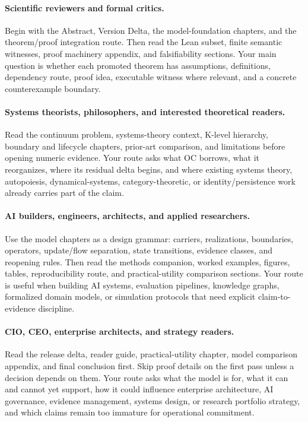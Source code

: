 \paragraph{Scientific reviewers and formal critics.}
Begin with the Abstract, Version Delta, the model-foundation chapters, and the
theorem/proof integration route. Then read the Lean subset, finite semantic
witnesses, proof machinery appendix, and falsifiability sections. Your main
question is whether each promoted theorem has assumptions, definitions,
dependency route, proof idea, executable witness where relevant, and a concrete
counterexample boundary.

\paragraph{Systems theorists, philosophers, and interested theoretical readers.}
Read the continuum problem, systems-theory context, K-level hierarchy, boundary
and lifecycle chapters, prior-art comparison, and limitations before opening
numeric evidence. Your route asks what OC borrows, what it reorganizes, where
its residual delta begins, and where existing systems theory, autopoiesis,
dynamical-systems, category-theoretic, or identity/persistence work already
carries part of the claim.

\paragraph{AI builders, engineers, architects, and applied researchers.}
Use the model chapters as a design grammar: carriers, realizations, boundaries,
operators, update/flow separation, state transitions, evidence classes, and
reopening rules. Then read the methods companion, worked examples, figures,
tables, reproducibility route, and practical-utility comparison sections. Your
route is useful when building AI systems, evaluation pipelines, knowledge
graphs, formalized domain models, or simulation protocols that need explicit
claim-to-evidence discipline.

\paragraph{CIO, CEO, enterprise architects, and strategy readers.}
Read the release delta, reader guide, practical-utility chapter, model
comparison appendix, and final conclusion first. Skip proof details on the
first pass unless a decision depends on them. Your route asks what the model is
for, what it can and cannot yet support, how it could influence enterprise
architecture, AI governance, evidence management, systems design, or research
portfolio strategy, and which claims remain too immature for operational
commitment.

